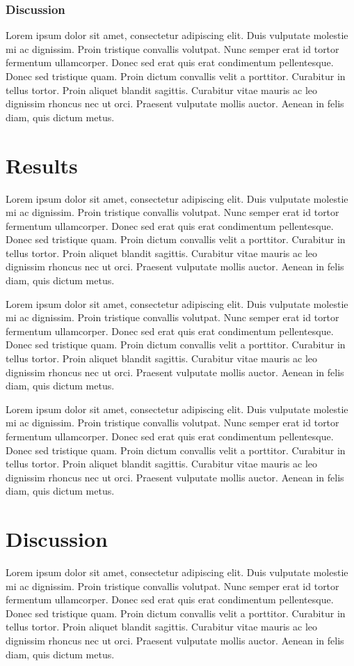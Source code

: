 \documentclass[11pt]{article}
\begin{document}
\subsubsection{Discussion}
Lorem ipsum dolor sit amet, consectetur adipiscing elit. Duis vulputate molestie mi ac dignissim. Proin tristique convallis volutpat. Nunc semper erat id tortor fermentum ullamcorper. Donec sed erat quis erat condimentum pellentesque. Donec sed tristique quam. Proin dictum convallis velit a porttitor. Curabitur in tellus tortor. Proin aliquet blandit sagittis. Curabitur vitae mauris ac leo dignissim rhoncus nec ut orci. Praesent vulputate mollis auctor. Aenean in felis diam, quis dictum metus.



\section{Results}
Lorem ipsum dolor sit amet, consectetur adipiscing elit. Duis vulputate molestie mi ac dignissim. Proin tristique convallis volutpat. Nunc semper erat id tortor fermentum ullamcorper. Donec sed erat quis erat condimentum pellentesque. Donec sed tristique quam. Proin dictum convallis velit a porttitor. Curabitur in tellus tortor. Proin aliquet blandit sagittis. Curabitur vitae mauris ac leo dignissim rhoncus nec ut orci. Praesent vulputate mollis auctor. Aenean in felis diam, quis dictum metus.

Lorem ipsum dolor sit amet, consectetur adipiscing elit. Duis vulputate molestie mi ac dignissim. Proin tristique convallis volutpat. Nunc semper erat id tortor fermentum ullamcorper. Donec sed erat quis erat condimentum pellentesque. Donec sed tristique quam. Proin dictum convallis velit a porttitor. Curabitur in tellus tortor. Proin aliquet blandit sagittis. Curabitur vitae mauris ac leo dignissim rhoncus nec ut orci. Praesent vulputate mollis auctor. Aenean in felis diam, quis dictum metus.

Lorem ipsum dolor sit amet, consectetur adipiscing elit. Duis vulputate molestie mi ac dignissim. Proin tristique convallis volutpat. Nunc semper erat id tortor fermentum ullamcorper. Donec sed erat quis erat condimentum pellentesque. Donec sed tristique quam. Proin dictum convallis velit a porttitor. Curabitur in tellus tortor. Proin aliquet blandit sagittis. Curabitur vitae mauris ac leo dignissim rhoncus nec ut orci. Praesent vulputate mollis auctor. Aenean in felis diam, quis dictum metus.

\section{Discussion}
Lorem ipsum dolor sit amet, consectetur adipiscing elit. Duis vulputate molestie mi ac dignissim. Proin tristique convallis volutpat. Nunc semper erat id tortor fermentum ullamcorper. Donec sed erat quis erat condimentum pellentesque. Donec sed tristique quam. Proin dictum convallis velit a porttitor. Curabitur in tellus tortor. Proin aliquet blandit sagittis. Curabitur vitae mauris ac leo dignissim rhoncus nec ut orci. Praesent vulputate mollis auctor. Aenean in felis diam, quis dictum metus.
\end{document}
